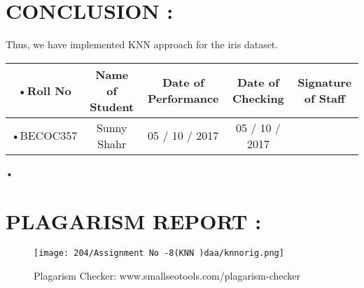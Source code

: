 \documentclass{article}
\begin{document}
	\section{CONCLUSION :}
	Thus, we have implemented KNN approach for the iris dataset.
	\begin{center}
		\begin{tabular}{|c|c|c|c|c|}
			\hline	
			•Roll No &  Name of Student & Date of Performance & Date of Checking &  Signature of Staff\\ \hline
			•BECOC357      & Sunny Shahr     & 05 / 10 / 2017                                  & 05 / 10 / 2017                             &  \\ \hline
		\end{tabular}•
	\end{center}
	
	
	\section{PLAGARISM REPORT :}
	\begin{figure}[h!]
		\centering
		\texttt{[image: 204/Assignment No -8(KNN )daa/knnorig.png]}
		\caption{Plagarism Checker: www.smallseotools.com/plagarism-checker}
	\end{figure}
\end{document}
